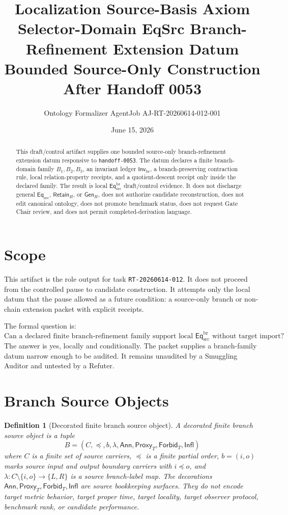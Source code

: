 \documentclass[11pt]{article}
\title{\textbf{Localization Source-Basis Axiom Selector-Domain EqSrc Branch-Refinement Extension Datum}\\[0.35em]
\large Bounded Source-Only Construction After Handoff 0053}
\author{Ontology Formalizer AgentJob AJ-RT-20260614-012-001}
\date{June 15, 2026}
\newcommand{\EqSrc}{\mathsf{Eq}_{\mathrm{src}}}
\newcommand{\EqBr}{\mathsf{Eq}_{\mathrm{src}}^{\mathrm{br}}}
\newcommand{\InvBr}{\mathsf{Inv}_{\mathrm{br}}}
\newcommand{\Ann}{\mathsf{Ann}}
\newcommand{\Proxy}{\mathsf{Proxy}_{T}}
\newcommand{\Forbid}{\mathsf{Forbid}_{T}}
\newcommand{\Infl}{\mathsf{Infl}}
\newcommand{\RetainH}{\mathsf{Retain}_{H}}
\newcommand{\GenH}{\mathsf{Gen}_{H}}
\newtheorem{definitionblock}{Definition}
\begin{document}
\maketitle

\begin{abstract}
This draft/control artifact supplies one bounded source-only branch-refinement
extension datum responsive to \texttt{handoff-0053}. The datum declares a
finite branch-domain family \(B_{1},B_{2},B_{3}\), an invariant ledger
\(\InvBr\), a branch-preserving contraction rule, local relation-property
receipts, and a quotient-descent receipt only inside the declared family.
The result is local \(\EqBr\) draft/control evidence. It does not discharge
general \(\EqSrc\), \(\RetainH\), or \(\GenH\), does not authorize
candidate reconstruction, does not edit canonical ontology, does not
promote benchmark status, does not request Gate Chair review, and does not
permit completed-derivation language.
\end{abstract}

\section{Scope}

This artifact is the role output for task \texttt{RT-20260614-012}. It
does not proceed from the controlled pause to candidate construction. It
attempts only the local datum that the pause allowed as a future condition:
a source-only branch or non-chain extension packet with explicit receipts.

The formal question is:
\[
    \text{Can a declared finite branch-refinement family support local }
    \EqBr\text{ without target import?}
\]
The answer is yes, locally and conditionally. The packet supplies a
branch-family datum narrow enough to be audited. It remains unaudited by a
Smuggling Auditor and untested by a Refuter.

\section{Branch Source Objects}

\begin{definitionblock}[Decorated finite branch source object]
A decorated finite branch source object is a tuple
\[
    B=(C,\preceq,b,\lambda,\Ann,\Proxy,\Forbid,\Infl)
\]
where \(C\) is a finite set of source carriers, \(\preceq\) is a finite
partial order, \(b=(i,o)\) marks source input and output boundary
carriers with \(i\preceq o\), and \(\lambda:C\setminus\{i,o\}\to
\{L,R\}\) is a source branch-label map. The decorations
\(\Ann,\Proxy,\Forbid,\Infl\) are source bookkeeping surfaces. They do
not encode target metric behavior, target proper time, target locality,
target observer protocol, benchmark rank, or candidate performance.
\end{definitionblock}
\end{document}
